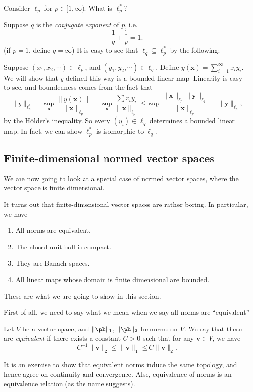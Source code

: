 \documentclass[a4paper]{article}
\begin{document}
\begin{eg}
  Consider $\ell_p$ for $p\in [1, \infty)$. What is $\ell_p^*$?

    Suppose $q$ is the \emph{conjugate exponent} of $p$, i.e.
    \[
      \frac{1}{q} + \frac{1}{p} = 1.
    \]
    (if $p = 1$, define $q = \infty$) It is easy to see that $\ell_q \subseteq \ell_p^*$ by the following:

    Suppose $(x_1, x_2, \cdots) \in \ell_p$, and $(y_1, y_2, \cdots)\in \ell_q$. Define $y(\mathbf{x}) = \sum_{i = 1}^\infty x_i y_i$. We will show that $y$ defined this way is a bounded linear map. Linearity is easy to see, and boundedness comes from the fact that
    \[
      \|y\|_{\ell_p^*} = \sup_{\mathbf{x}}\frac{\|y(\mathbf{x})\|}{\|\mathbf{x}\|_{\ell_p}} = \sup_{\mathbf{x}} \frac{\sum x_i y_i}{\|\mathbf{x}\|_{\ell_p}} \leq \sup \frac{\|\mathbf{x}\|_{\ell_p}\|\mathbf{y}\|_{\ell_q}}{\|\mathbf{x}\|_{\ell_p}} = \|\mathbf{y}\|_{\ell_p},
    \]
    by the H\"older's inequality. So every $(y_i) \in \ell_q$ determines a bounded linear map. In fact, we can show $\ell_p^*$ is isomorphic to $\ell_q$.
\end{eg}

\subsection{Finite-dimensional normed vector spaces}
We are now going to look at a special case of normed vector spaces, where the vector space is finite dimensional.

It turns out that finite-dimensional vector spaces are rather boring. In particular, we have
\begin{enumerate}
  \item All norms are equivalent.
  \item The closed unit ball is compact.
  \item They are Banach spaces.
  \item All linear maps whose domain is finite dimensional are bounded.
\end{enumerate}
These are what we are going to show in this section.

First of all, we need to say what we mean when we say all norms are ``equivalent''
\begin{defi}
  Let $V$ be a vector space, and $\|\ph \|_1$, $\|\ph \|_2$ be norms on $V$. We say that these are \emph{equivalent} if there exists a constant $C > 0$ such that for any $\mathbf{v}\in V$, we have
  \[
    C^{-1}\|\mathbf{v}\|_2 \leq \|\mathbf{v}\|_1 \leq C\|\mathbf{v}\|_2.
  \]
\end{defi}
It is an exercise to show that equivalent norms induce the same topology, and hence agree on continuity and convergence. Also, equivalence of norms is an equivalence relation (as the name suggests).
\end{document}
